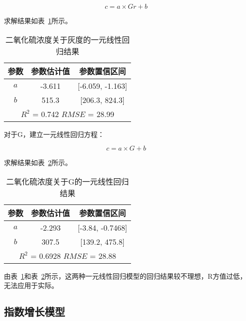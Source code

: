 $$c=a \times Gr+b$$

求解结果如表~\ref{SO2_Gr_linear}所示。

\begin{table}[]
    \centering
    \caption{二氧化硫浓度关于灰度的一元线性回归结果}
    \label{SO2_Gr_linear}
    \begin{tabular}{@{}ccc@{}}
    \toprule
    参数       & 参数估计值      & 参数置信区间                   \\ \midrule
    $a$      & -3.611     & {[}-6.059, -1.163{]}     \\
    $b$      & 515.3      & {[}206.3, 824.3{]}       \\ \midrule
    \multicolumn{3}{c}{$R^2$ = 0.742 $RMSE$ = 28.99} \\ \bottomrule
    \end{tabular}
    \end{table}


对于G，建立一元线性回归方程：

$$c=a \times G+b$$

求解结果如表~\ref{SO2_G_linear}所示。

\begin{table}[]
    \centering
    \caption{二氧化硫浓度关于G的一元线性回归结果}
    \label{SO2_G_linear}
    \begin{tabular}{@{}ccc@{}}
    \toprule
    参数       & 参数估计值      & 参数置信区间                   \\ \midrule
    $a$      & -2.293     & {[}-3.84, -0.7468{]}     \\
    $b$      & 307.5      & {[}139.2, 475.8{]}       \\ \midrule
    \multicolumn{3}{c}{$R^2$ = 0.6928 $RMSE$ = 28.88} \\ \bottomrule
    \end{tabular}
\end{table}


由表~\ref{SO2_Gr_linear}和表~\ref{SO2_G_linear}所示，这两种一元线性回归模型的回归结果较不理想，R方值过低，无法应用于实际。

\subsection{指数增长模型}

